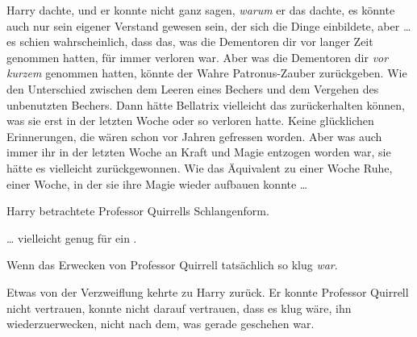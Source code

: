 Harry dachte, und er konnte nicht ganz sagen, \emph{warum} er das dachte, es könnte auch nur sein eigener Verstand gewesen sein, der sich die Dinge einbildete, aber … es schien wahrscheinlich, dass das, was die Dementoren dir vor langer Zeit genommen hatten, für immer verloren war. Aber was die Dementoren dir \emph{vor kurzem} genommen hatten, könnte der Wahre Patronus-Zauber zurückgeben. Wie den Unterschied zwischen dem Leeren eines Bechers und dem Vergehen des unbenutzten Bechers. Dann hätte Bellatrix vielleicht das zurückerhalten können, was sie erst in der letzten Woche oder so verloren hatte. Keine glücklichen Erinnerungen, die wären schon vor Jahren gefressen worden. Aber was auch immer ihr in der letzten Woche an Kraft und Magie entzogen worden war, sie hätte es vielleicht zurückgewonnen. Wie das Äquivalent zu einer Woche Ruhe, einer Woche, in der sie ihre Magie wieder aufbauen konnte …

Harry betrachtete Professor Quirrells Schlangenform.

… vielleicht genug für ein .%

Wenn das Erwecken von Professor Quirrell tatsächlich so klug \emph{war}.

Etwas von der Verzweiflung kehrte zu Harry zurück. Er konnte Professor Quirrell nicht vertrauen, konnte nicht darauf vertrauen, dass es klug wäre, ihn wiederzuerwecken, nicht nach dem, was gerade geschehen war.

